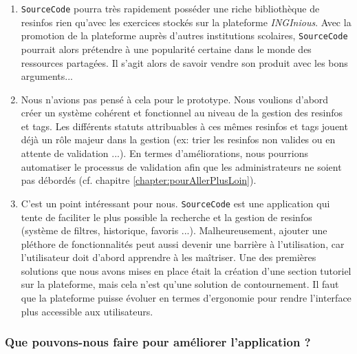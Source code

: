 \bigskip
\begin{enumerate}
    \item \texttt{SourceCode} pourra très rapidement posséder une riche bibliothèque de \glspl{resinfo} rien qu'avec les exercices stockés sur la plateforme \textit{INGInious}. Avec la promotion de la plateforme auprès d'autres institutions scolaires, \texttt{SourceCode} pourrait alors prétendre à une popularité certaine dans le monde des ressources partagées. Il s'agit alors de savoir vendre son produit avec les bons arguments...
    \item Nous n'avions pas pensé à cela pour le prototype. Nous voulions d'abord créer un système cohérent et fonctionnel au niveau de la gestion des \glspl{resinfo} et \glspl{tag}. Les différents statuts attribuables à ces mêmes \glspl{resinfo} et \glspl{tag} jouent déjà un rôle majeur dans la gestion (ex: trier les \glspl{resinfo} non valides ou en attente de validation ...). En termes d'améliorations, nous pourrions automatiser le processus de validation afin que les administrateurs ne soient pas débordés (cf. chapitre \ref{chapter:pourAllerPlusLoin}).
    \item C'est un point intéressant pour nous. \texttt{SourceCode} est une application qui tente de faciliter le plus possible la recherche et la gestion de \glspl{resinfo} (système de filtres, historique, favoris ...). Malheureusement, ajouter une pléthore de fonctionnalités peut aussi devenir une barrière à l'utilisation, car l'utilisateur doit d'abord apprendre à les maîtriser. Une des premières solutions que nous avons mises en place était la création d'une section tutoriel sur la plateforme, mais cela n'est qu'une solution de contournement. Il faut que la plateforme puisse évoluer en termes d'ergonomie pour rendre l'interface plus accessible aux utilisateurs.
\end{enumerate}

\subsubsection*{Que pouvons-nous faire pour améliorer l'application ?}

